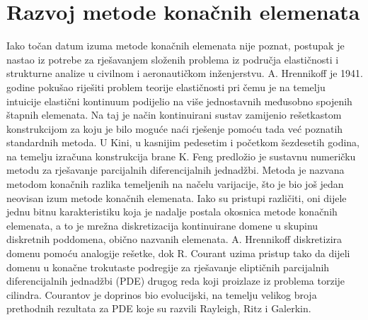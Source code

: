 \documentclass[a4paper,twoside,12pt]{memoir} %
\begin{document}
\section{Razvoj metode konačnih elemenata}
Iako točan datum izuma metode konačnih elemenata nije poznat, postupak je nastao iz potrebe za rješavanjem složenih problema iz područja elastičnosti i strukturne analize u civilnom i aeronautičkom inženjerstvu. A. Hrennikoff je 1941. godine pokušao riješiti problem teorije elastičnosti pri čemu je na temelju intuicije elastični kontinuum podijelio na više jednostavnih međusobno spojenih štapnih elemenata. Na taj je način kontinuirani sustav zamijenio rešetkastom konstrukcijom za koju je bilo moguće naći rješenje pomoću tada već poznatih standardnih metoda. U Kini, u kasnijim pedesetim i početkom šezdesetih godina, na temelju izračuna konstrukcija brane K. Feng predložio je sustavnu numeričku metodu za rješavanje parcijalnih diferencijalnih jednadžbi. Metoda je nazvana metodom konačnih razlika temeljenih na načelu varijacije, što je bio još jedan neovisan izum metode konačnih elemenata. Iako su pristupi različiti, oni dijele jednu bitnu karakteristiku koja je nadalje postala okosnica metode konačnih elemenata, a to je mrežna diskretizacija kontinuirane domene u skupinu diskretnih poddomena, obično nazvanih elemenata. A. Hrennikoff diskretizira domenu pomoću analogije rešetke, dok R. Courant uzima pristup tako da dijeli domenu u konačne trokutaste podregije za rješavanje eliptičnih parcijalnih diferencijalnih jednadžbi (PDE) drugog reda koji proizlaze iz problema torzije cilindra. Courantov je doprinos bio evolucijski, na temelju velikog broja prethodnih rezultata za PDE koje su razvili Rayleigh, Ritz i Galerkin. \cite{wiki_fem_4} \cite{wiki_fem_5} \par
\end{document}
